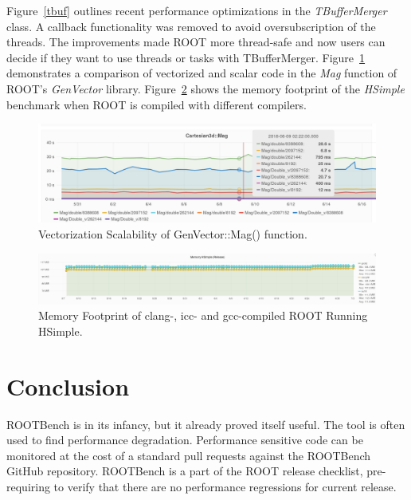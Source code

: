 \documentclass{webofc}
\begin{document}
Figure~\ref{tbuf} outlines recent performance optimizations in the \textit{TBufferMerger} class. A callback functionality was removed to avoid oversubscription of the threads. The improvements made ROOT more thread-safe and now users can decide if they want to use threads or tasks with TBufferMerger. Figure~\ref{fig:genvec} demonstrates a comparison of vectorized and scalar code in the \textit{Mag} function of ROOT's \textit{GenVector} library. Figure~\ref{fig:compilers} shows the memory footprint of the \textit{HSimple} benchmark when ROOT is compiled with different compilers.

\begin{figure}[h]
\centering
\includegraphics[width=0.8\linewidth]{pictures/genvector.png}
\caption{Vectorization Scalability of GenVector::Mag() function.}
\label{fig:genvec}
\end{figure}

\begin{figure}[h]
\centering
\includegraphics[width=0.8\linewidth]{pictures/7.png}
\caption{Memory Footprint of clang-, icc- and gcc-compiled ROOT Running HSimple.}
\label{fig:compilers}
\end{figure}


\section {Conclusion}

ROOTBench is in its infancy, but it already proved itself useful. The tool is often used to find performance degradation. Performance sensitive code can be monitored at the cost of a standard pull requests against the ROOTBench GitHub repository. ROOTBench is a part of the ROOT release checklist, pre-requiring to verify that there are no performance regressions for current release. 
\end{document}
